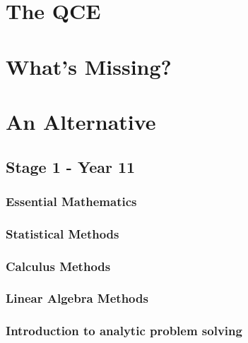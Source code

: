 \documentclass[12pt]{report}
\begin{document}
\chapter{The QCE}





\chapter{What's Missing?}




\chapter{An Alternative}
\section{Stage 1 - Year 11}

\subsection{Essential Mathematics}

\subsection{Statistical Methods}
\subsection{Calculus Methods}
\subsection{Linear Algebra Methods}
\subsection{Introduction to analytic problem solving}
\end{document}
